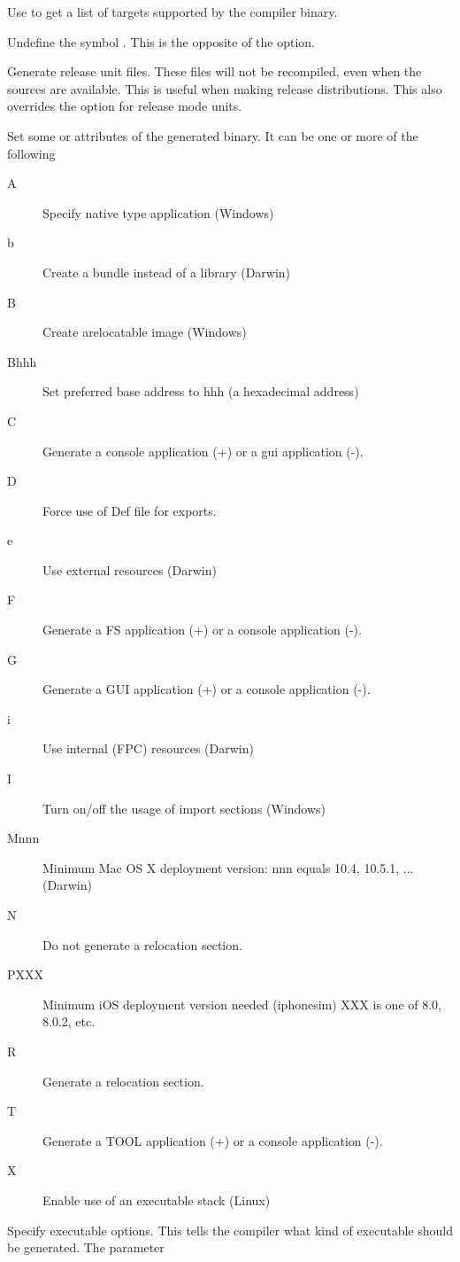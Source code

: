 \begin{description}
Use  to get a list of targets supported by the compiler binary.
\item [-uxxx]  Undefine the symbol . This is the opposite
of the  option.
\item [-Ur]  Generate release unit files. These files will not be
recompiled, even when the sources are available. This is useful when making
release distributions. This also overrides the  option for release
mode units.
\item[-W] Set some \windows or \ostwo attributes of the generated binary. It
can be one or more of the following
\begin{description}
\item[A] Specify native type application (Windows)
\item[b] Create a bundle instead of a library (Darwin)
\item[B] Create arelocatable image (Windows)
\item[Bhhh] Set preferred base address to hhh (a hexadecimal address)
\item[C] Generate a console application (+) or a gui application (-).
\item[D] Force use of Def file for exports.
\item[e] Use external resources (Darwin)
\item[F] Generate a FS application (+) or a console application (-).
\item[G] Generate a GUI application (+) or a console application (-).
\item[i] Use internal (FPC) resources (Darwin)
\item[I] Turn on/off the usage of import sections (Windows)
\item[Mnnn] Minimum Mac OS X deployment version: nnn equals 10.4, 10.5.1, ... (Darwin)
\item[N] Do not generate a relocation section.
\item[PXXX] Minimum iOS deployment version needed (iphonesim) XXX is one of 8.0, 8.0.2, etc.
\item[R] Generate a relocation section.
\item[T] Generate a TOOL application (+) or a console application (-).
\item[X] Enable use of an executable stack (Linux)
\end{description}
\item [-Xx]  Specify executable options. This tells the compiler what
kind of executable should be generated. The parameter 

\end{description}
